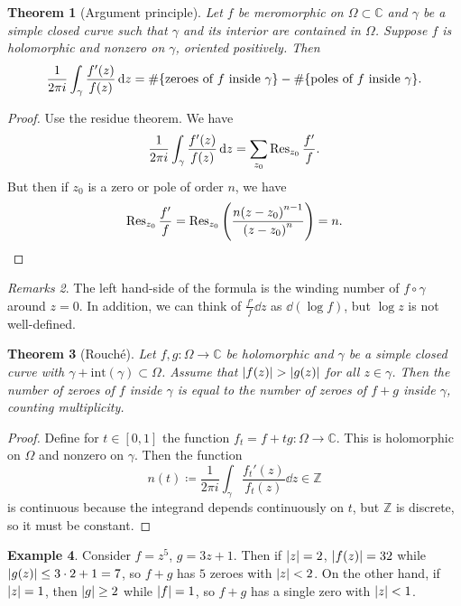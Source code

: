 \documentclass[leqno, openany]{memoir}
\newtheorem{thm}{Theorem}[section]
\theoremstyle{definition}
\newtheorem{exm}[thm]{Example}
\theoremstyle{remark}
\newtheorem{rmks}[thm]{Remarks}
\theoremstyle{plain}
\theoremstyle{definition}
\theoremstyle{remark}
\newcommand{\C}{\mathbb{C}}
\newcommand{\Z}{\mathbb{Z}}
\newcommand{\mr}[1]{\mathrm{#1}}
\begin{document}
\begin{thm}[Argument principle] Let $f$ be meromorphic on $\Omega \subset \C$
    and $\gamma$ be a simple closed curve such that $\gamma$ and its interior
    are contained in $\Omega$. Suppose $f$ is holomorphic and nonzero on
    $\gamma$, oriented positively. Then \[ \frac{1}{2 \pi i} \int_{\gamma}
    \frac{f'(z)}{f(z)} \dd{z} = \#\qty{\text{zeroes of $f$ inside $\gamma$}} -
\#\qty{\text{poles of $f$ inside $\gamma$}}. \] \end{thm}

\begin{proof} Use the residue theorem. We have \[ \frac{1}{2 \pi i}
    \int_{\gamma} \frac{f'(z)}{f(z)} \dd{z} = \sum_{z_0} \Res_{z_0}
    \frac{f'}{f}. \] But then if $z_0$ is a zero or pole of order $n$, we have
    \[ \Res_{z_0} \frac{f'}{f} = \Res_{z_0}
    \qty(\frac{n{(z-z_0)}^{n-1}}{{(z-z_0)}^n}) = n. \] \end{proof}

\begin{rmks} The left hand-side of the formula is the winding number of $f
\circ \gamma$ around $z = 0$. In addition, we can think of $\frac{f'}{f}
\dd{z}$ as $\dd{(\log f)}$, but $\log z$ is not well-defined.  \end{rmks}

\begin{thm}[Rouch\'e] Let $f, g \colon \Omega \to \C$ be holomorphic and
    $\gamma$ be a simple closed curve with $\gamma + \mr{int}(\gamma) \subset
    \Omega$. Assume that $\abs{f(z)} > \abs{g(z)}$ for all $z \in \gamma$. Then
    the number of zeroes of $f$ inside $\gamma$ is equal to the number of
    zeroes of $f + g$ inside $\gamma$, counting multiplicity.  \end{thm}

\begin{proof} Define for $t \in [0,1]$ the function $f_t = f + tg \colon \Omega
    \to \C$. This is holomorphic on $\Omega$ and nonzero on $\gamma$. Then the
    function \[ n(t) \coloneqq \frac{1}{2 \pi i} \int_{\gamma}
    \frac{f_t'(z)}{f_t(z)} \dd{z} \in \Z \] is continuous because the integrand
depends continuously on $t$, but $\Z$ is discrete, so it must be constant.
\end{proof}

\begin{exm} Consider $f = z^5$, $g = 3z + 1$. Then if $\abs{z} = 2$,
    $\abs{f(z)} = 32$ while $\abs{g(z)} \leq 3 \cdot 2 + 1 = 7$, so $f + g$ has
    $5$ zeroes with $\abs{z} < 2$. On the other hand, if $\abs{z} = 1$, then
    $\abs{g} \geq 2$ while $\abs{f} = 1$, so $f + g$ has a single zero with
    $\abs{z} < 1$.  \end{exm}
\end{document}

